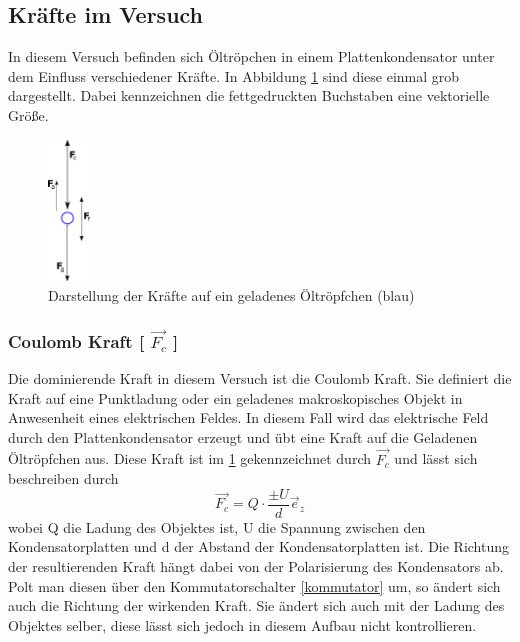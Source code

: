\documentclass{scrartcl}
\begin{document}
	\subsection{Kräfte im Versuch}
		In diesem Versuch befinden sich Öltröpchen in einem Plattenkondensator unter dem Einfluss verschiedener Kräfte.
		In Abbildung \ref{forces} sind diese einmal grob dargestellt. Dabei kennzeichnen die fettgedruckten Buchstaben eine
		vektorielle Größe.
		\begin{figure}[H]
			\centering
			\includegraphics[width=0.1\textwidth]{kräfte.png} 
			\caption{Darstellung der Kräfte auf ein geladenes Öltröpfchen (blau)}
			\label{forces}
		\end{figure}

		\subsubsection{Coulomb Kraft [ $\vec{F_c}$ ]}
			Die dominierende Kraft in diesem Versuch ist die Coulomb Kraft. Sie definiert die Kraft auf eine Punktladung oder ein
			geladenes makroskopisches Objekt in Anwesenheit eines elektrischen Feldes. In diesem Fall wird das elektrische Feld
			durch den Plattenkondensator erzeugt und übt eine Kraft auf die Geladenen Öltröpfchen aus. Diese Kraft ist im \ref{forces}
			gekennzeichnet durch $\vec{F_c}$ und lässt sich beschreiben durch
			\begin{equation}
				\vec{F_c} = Q \cdot \frac{\pm U}{d} \vec{e}_z
			\end{equation}
			wobei Q die Ladung des Objektes ist, U die Spannung zwischen den Kondensatorplatten und d der Abstand der Kondensatorplatten ist.
			Die Richtung der resultierenden Kraft hängt dabei von der Polarisierung des Kondensators ab. Polt man diesen über den Kommutatorschalter \ref{kommutator}
			um, so ändert sich auch die Richtung der wirkenden Kraft. Sie ändert sich auch mit der Ladung des Objektes selber,
			diese lässt sich jedoch in diesem Aufbau nicht kontrollieren.	
		
\end{document}
